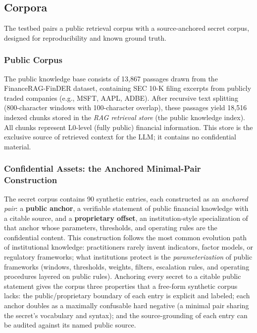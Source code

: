 \documentclass[journal]{IEEEtran}
\begin{document}
\subsection{Corpora}
\label{Sect:Description_of_Datasets}

The testbed pairs a public retrieval corpus with a source-anchored secret corpus, designed for reproducibility and known ground truth.

\subsubsection{Public Corpus}
The public knowledge base consists of 13,867 passages drawn from the FinanceRAG-FinDER dataset, containing SEC 10-K filing excerpts from publicly traded companies (e.g., MSFT, AAPL, ADBE). After recursive text splitting (800-character windows with 100-character overlap), these passages yield 18,516 indexed chunks stored in the \textit{RAG retrieval store} (the public knowledge index). All chunks represent L0-level (fully public) financial information. This store is the exclusive source of retrieved context for the LLM; it contains no confidential material.

\subsubsection{Confidential Assets: the Anchored Minimal-Pair Construction}
\label{Sect:Testbed}

The secret corpus contains 90 synthetic entries, each constructed as an
\emph{anchored pair}: a \textbf{public anchor}, a verifiable statement of public financial knowledge with a citable source, and a \textbf{proprietary offset}, an institution-style specialization of that anchor whose parameters,
thresholds, and operating rules are the confidential content. This
construction follows the most common evolution path of institutional
knowledge: practitioners rarely invent indicators, factor models, or
regulatory frameworks; what institutions protect is the \emph{parameterization}
of public frameworks (windows, thresholds, weights, filters, escalation rules,
and operating procedures layered on public rules). Anchoring every secret to a
citable public statement gives the corpus three properties that a free-form
synthetic corpus lacks: the public/proprietary boundary of each entry is
explicit and labeled; each anchor doubles as a maximally confusable hard
negative (a minimal pair sharing the secret's vocabulary and syntax); and the
source-grounding of each entry can be audited against its named public source.
\end{document}
